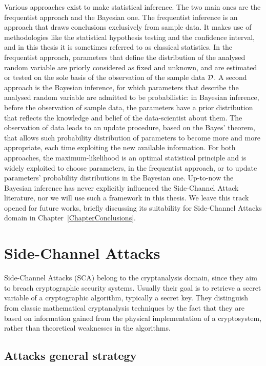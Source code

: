 Various approaches exist to make statistical inference. The two main ones are the frequentist approach and the Bayesian one. The frequentist inference is an approach that draws conclusions exclusively from sample data. It makes use of methodologies like the statistical hypothesis testing and the confidence interval, and in this thesis it is sometimes referred to as classical statistics. In the frequentist approach, parameters that define the distribution of the analysed random variable are priorly considered as fixed and unknown, and are estimated or tested on the sole basis of the observation of the sample data $\mathcal{D}$. A second approach is the Bayesian inference, for which parameters that describe the analysed random variable are admitted to be probabilistic: in Bayesian inference, before the observation of sample data, the parameters have a prior distribution that reflects the knowledge and belief of the data-scientist about them. The observation of data leads to an update procedure, based on the Bayes' theorem, that allows such probability distribution of parameters to become more and more appropriate, each time exploiting the new available information. For both approaches, the maximum-likelihood is an optimal statistical principle and is widely exploited to choose parameters, in the frequentist approach, or to update parameters' probability distributions in the Bayesian one. Up-to-now the Bayesian inference has never explicitly influenced the Side-Channel Attack literature, nor we will use such a framework in this thesis. We leave this track opened for future works, briefly discussing its suitability for Side-Channel Attacks domain in Chapter~\ref{ChapterConclusions}.


\section{Side-Channel Attacks}

Side-Channel Attacks (SCA) belong to the cryptanalysis domain, since they aim to breach cryptographic security systems. Usually their goal is to retrieve a secret variable of a cryptographic algorithm, typically a secret key. They distinguish from classic mathematical cryptanalysis techniques by the fact that they are based on information gained from the physical implementation of a cryptosystem, rather than theoretical weaknesses in the algorithms. 

\subsection{Attacks general strategy}
